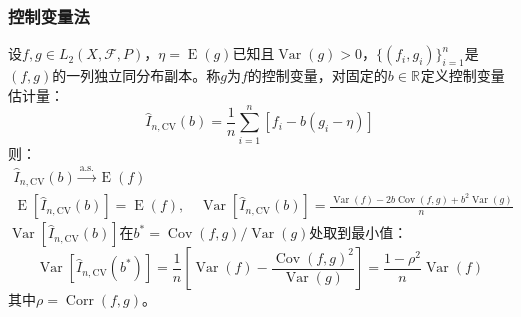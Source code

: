 \subsubsection{控制变量法}
\begin{method}
	设$f,g\in L_2(X,\mathscr{F},P)$，$\eta=\operatorname{E}(g)$已知且$\operatorname{Var}(g)>0$，$\{(f_i,g_i)\}_{i=1}^n$是$(f,g)$的一列独立同分布副本。称$g$为$f$的控制变量，对固定的$b\in\mathbb{R}^{}$定义控制变量估计量：
	\begin{equation*}
		\hat{I}_{n,\mathrm{CV}}(b)=\frac{1}{n}\sum_{i=1}^{n}[f_i-b(g_i-\eta)]
	\end{equation*}
	则：
	\begin{gather*}
		\hat{I}_{n,\mathrm{CV}}(b)\overset{\text{a.s.}}{\longrightarrow}\operatorname{E}(f) \\
		\operatorname{E}[\hat{I}_{n,\mathrm{CV}}(b)]=\operatorname{E}(f),\quad\operatorname{Var}[\hat{I}_{n,\mathrm{CV}}(b)]=\frac{\operatorname{Var}(f)-2b\operatorname{Cov}(f,g)+b^2\operatorname{Var}(g)}{n}
	\end{gather*}
	$\operatorname{Var}[\hat{I}_{n,\mathrm{CV}}(b)]$在$b^*=\operatorname{Cov}(f,g)/\operatorname{Var}(g)$处取到最小值：
	\begin{equation*}
		\operatorname{Var}[\hat{I}_{n,\mathrm{CV}}(b^*)]=\frac{1}{n}\left[\operatorname{Var}(f)-\frac{\operatorname{Cov}(f,g)^2}{\operatorname{Var}(g)}\right]=\frac{1-\rho^2}{n}\operatorname{Var}(f)
	\end{equation*}
	其中$\rho=\operatorname{Corr}(f,g)$。
\end{method}
